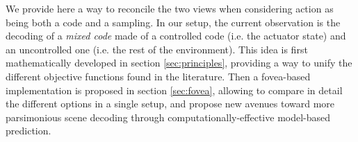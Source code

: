 \documentclass{article}
\begin{document}
We provide here a way to reconcile the two views when considering action as being both a code and a sampling. 
In our setup, the current observation is the decoding of a \emph{mixed code}  
made of a controlled code (i.e. the actuator state) and an uncontrolled one (i.e. the rest of the environment). This idea is first mathematically developed in section \ref{sec:principles}, providing a way to unify the different objective functions found in the literature. 
Then a fovea-based implementation is proposed in section \ref{sec:fovea}, allowing to compare in detail the different options in a single setup, and propose new avenues toward more parsimonious scene decoding through computationally-effective model-based prediction.

\end{document}
